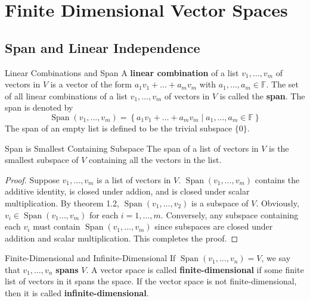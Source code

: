 \documentclass{book}
\newcommand{\field}{\mathbb{F}}
\newcommand{\set}[2]{\left\{#1\;\vert\;#2\right\}}
\theoremstyle{definition}
\DeclareMathOperator{\linspan}{Span}
\begin{document}
\chapter{Finite Dimensional Vector Spaces}

\section{Span and Linear Independence}

\begin{definition}{Linear Combinations and Span}
    A \textbf{linear combination} of a list $ v_1,\dots,v_m$ of vectors in $V$
    is a vector of the form $a_1v_1+\dots+a_mv_m$ with $ a_1,\dots,a_m \in
    \field$. The set of all linear combinations of a list $ v_1,\dots,v_m$ of 
    vectors in $V$ is called the \textbf{span}. The span is denoted by
    \[
        \linspan(v_1,\dots,v_m) = \set{a_1v_1+\dots+a_mv_m}{a_1,\dots,a_m \in 
        \field}
    \]
    The span of an empty list is defined to be the trivial subspace $\{0\}$.
\end{definition}

\begin{thm}{Span is Smallest Containing Subspace}
    The span of a list of vectors in $V$ is the smallest subspace of $V$
    containing all the vectors in the list.
\end{thm}

\begin{proof}
    Suppose $v_1,\dots,v_m$ is a list of vectors in $V$. $\linspan(v_1,\dots,v_m)$
    contains the additive identity, is closed under addion, and is closed under
    scalar multiplication. By theorem 1.2, $\linspan(v_1,\dots,v_2)$ is a subspace
    of $V$. Obviously, $v_i \in \linspan(v_1\dots,v_m)$ for each $i =1,\dots,m$.
    Conversely, any subspace containing each $v_i$ must contain
    $\linspan(v_1,\dots,v_m)$ since subspaces are closed under addition and scalar
    multiplication. This completes the proof.
\end{proof}

\begin{definition}{Finite-Dimensional and Infinite-Dimensional}
    If $\linspan(v_1,\dots,v_n) = V$, we say that $v_1,\dots,v_n$
    \textbf{spans} $V$. A vector space is called \textbf{finite-dimensional} if
    some finite list of vectors in it spans the space. If the vector space is
    not finite-dimensional, then it is called \textbf{infinite-dimensional}.
\end{definition}
\end{document}
